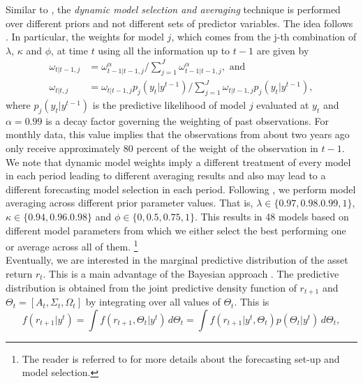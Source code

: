 %
\indent Similar to \cite{koop2013}, the \textit{dynamic model selection and averaging} technique is performed over different priors and not different sets of predictor variables. The idea follows \cite{raftery2010}. In particular, the weights for model $j$, which comes from the j-th combination of $\lambda$, $\kappa$ and $\phi$, at time $t$ using all the information up to $t-1$ are given by
\begin{align}
	\omega_{t|t-1,j}&=\omega_{t-1|t-1,j}^{\alpha}\Big/\sum_{j=1}^J\omega_{t-1|t-1,j}^{\alpha},\text{ and}\\
	\omega_{t|t,j}&=\omega_{t|t-1,j}p_j(y_t|y^{t-1})\Big/\sum_{j=1}^J\omega_{t|t-1,j}p_j(y_t|y^{t-1}),
\end{align}
where $p_j(y_t|y^{t-1})$ is the predictive likelihood of model $j$ evaluated at $y_t$ and $\alpha=0.99$ is a decay factor governing the weighting of past observations. For monthly data, this value implies that the observations from about two years ago only receive approximately 80 percent of the weight of the observation in $t-1$. We note that dynamic model weights imply a different treatment of every model in each period leading to different averaging results and also may lead to a different forecasting model selection in each period. Following \cite{koop2013}, we perform model averaging %
across different prior parameter values. That is, $\lambda\in\{0.97, 0.98.0.99, 1\}$, $\kappa\in\{0.94, 0.96.0.98\}$ and $\phi\in\{0,0.5,0.75,1\}$. This results in 48 models based on different model parameters from which we either select the best performing one or average across all of them.%
\footnote{The reader is referred to \cite{koop2013} for more details about the forecasting set-up and model selection.}\\
%
\indent Eventually, we are interested in the marginal predictive distribution of the asset return $r_t$. This is a main advantage of the Bayesian approach \citep{klein1976,barberis2000}. The predictive distribution is obtained from the joint predictive density function of $r_{t+1}$ and $\Theta_t=\left[A_t,\Sigma_t,\Omega_t\right]$ by integrating over all values of $\Theta_t$. This is 
\begin{equation}
\label{eqn:pred1}
f(r_{t+1}|y^t)=\int f(r_{t+1},\Theta_t|y^t)\,d\Theta_t=\int f(r_{t+1}|y^t,\Theta_t)p(\Theta_t|y^t)\,d\Theta_t,
\end{equation}
